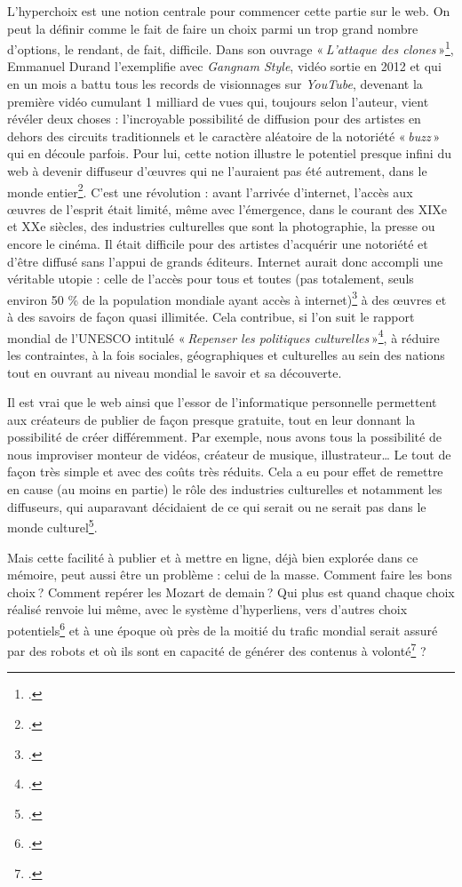 L'hyperchoix est une notion centrale pour commencer cette partie sur le web. On peut la définir comme le fait de faire un choix parmi un trop grand nombre d’options, le rendant, de fait, difficile. Dans son ouvrage « \textit{L’attaque des clones} »\footcite{durand2016}, Emmanuel Durand l’exemplifie avec \textit{Gangnam Style}, vidéo sortie en 2012 et qui en un mois a battu tous les records de visionnages sur \textit{YouTube}, devenant la première vidéo cumulant 1 milliard de vues qui, toujours selon l’auteur, vient révéler deux choses : l’incroyable possibilité de diffusion pour des artistes en dehors des circuits traditionnels et le caractère aléatoire de la notoriété « \textit{buzz} » qui en découle parfois. Pour lui, cette notion illustre le potentiel presque infini du web à devenir diffuseur d’œuvres qui ne l’auraient pas été autrement, dans le monde entier\footcite[§ 1 et § 4]{durand_chapitre_2016}. C’est une révolution : avant l’arrivée d’internet, l’accès aux œuvres de l’esprit était limité, même avec l’émergence, dans le courant des XIXe et XXe siècles, des industries culturelles que sont la photographie, la presse ou encore le cinéma. Il était difficile pour des artistes d’acquérir une notoriété et d’être diffusé sans l’appui de grands éditeurs. Internet aurait donc accompli une véritable utopie : celle de l’accès pour tous et toutes (pas totalement, seuls environ 50 \% de la population mondiale ayant accès à internet)\footcite{2024h} à des œuvres et à des savoirs de façon quasi illimitée. Cela contribue, si l’on suit le rapport mondial de l’UNESCO intitulé « \textit{Repenser les politiques culturelles} »\footcite[cité dans Durand Emmanuel, \textit{l'attaque des clones}... § 10]{zotero-651}, à réduire les contraintes, à la fois sociales, géographiques et culturelles au sein des nations tout en ouvrant au niveau mondial le savoir et sa découverte.

Il est vrai que le web ainsi que l’essor de l’informatique personnelle permettent aux créateurs de publier de façon presque gratuite, tout en leur donnant la possibilité de créer différemment. Par exemple, nous avons tous la possibilité de nous improviser monteur de vidéos, créateur de musique, illustrateur… Le tout de façon très simple et avec des coûts très réduits. Cela a eu pour effet de remettre en cause (au moins en partie) le rôle des industries culturelles et notamment les diffuseurs, qui auparavant décidaient de ce qui serait ou ne serait pas dans le monde culturel\footcite[§ 19]{durand_chapitre_2016}.

Mais cette facilité à publier et à mettre en ligne, déjà bien explorée dans ce mémoire, peut aussi être un problème : celui de la masse. Comment faire les bons choix ? Comment repérer les Mozart de demain ? Qui plus est quand chaque choix réalisé renvoie lui même, avec le système d'hyperliens, vers d’autres choix potentiels\footcite{noauthor_hyperchoix_nodate} et à une époque où près de la moitié du trafic mondial serait assuré par des robots et où ils sont en capacité de générer des contenus à volonté\footcite{ertzscheid2023} ?

